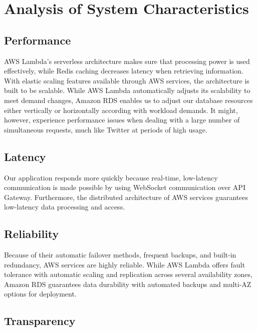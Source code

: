\documentclass{article}
\begin{document}
\section{Analysis of System Characteristics}


\subsection{Performance}

\hspace{1cm} AWS Lambda's serverless architecture makes sure that processing power is used effectively, while Redis caching decreases latency when retrieving information. With elastic scaling features available through AWS services, the architecture is built to be scalable. While AWS Lambda automatically adjusts its scalability to meet demand changes, Amazon RDS enables us to adjust our database resources either vertically or horizontally according with workload demands. It might, however, experience performance issues when dealing with a large number of simultaneous requests, much like Twitter at periods of high usage.

\subsection{Latency}

\hspace{1cm} Our application responds more quickly because real-time, low-latency communication is made possible by using WebSocket communication over API Gateway. Furthermore, the distributed architecture of AWS services guarantees low-latency data processing and access.

\subsection{Reliability}

\hspace{1cm}Because of their automatic failover methods, frequent backups, and built-in redundancy, AWS services are highly reliable. While AWS Lambda offers fault tolerance with automatic scaling and replication across several availability zones, Amazon RDS guarantees data durability with automated backups and multi-AZ options for deployment.


\subsection{Transparency}
\end{document}
